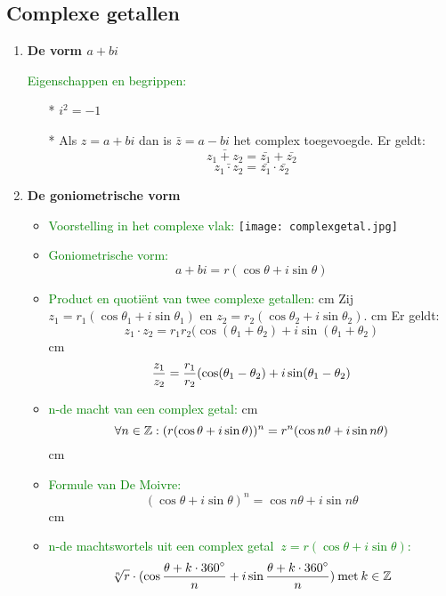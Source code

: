 \subsection{Complexe getallen} \label{complexe_getallen}
\hypertarget{complexe_getallen}{}
\begin{enumerate}%
\item \hypertarget{vorm_a_plus_bi}{{\bf De vorm $a + bi$}}\label{vorm_a_plus_bi}\vskip 0.3cm
\textcolor{green}{Eigenschappen en begrippen:}\newline
\begin{itemize} %
\item[*] $i^2=-1$
\item[*] Als $z=a+bi$ dan is $\bar{z}=a-bi$ het complex toegevoegde. \newline
		Er geldt:
		\[\bar{z_1+z_2}=\bar{z_1}+\bar{z_2}\]
		\[\bar{z_1\cdot z_2}=\bar{z_1}\cdot\bar{z_2}\]
\end{itemize}%
\item {\bf De goniometrische vorm}
\begin{itemize}
\item\textcolor{green}{Voorstelling in het complexe vlak:}\newline
\texttt{[image: complexgetal.jpg]}
\item\textcolor{green}{\hypertarget{goniometrische_vorm}{Goniometrische vorm:}}\label{goniometrische_vorm}
		\[a+bi=r(\cos\theta +i\sin\theta)\]
\item\textcolor{green}{Product en quoti\"ent van twee complexe getallen:} cm
Zij $z_1=r_1(\cos\theta_1 +i\sin\theta_1)$ en $z_2=r_2(\cos\theta_2+i\sin\theta_2)$. cm Er geldt:
\[z_1\cdot z_2=r_1r_2(\cos(\theta_1+\theta_2)+i\sin(\theta_1+\theta_2)\]  cm
\[\displaystyle\frac{\displaystyle z_1}{\displaystyle z_2}=\displaystyle\frac{\displaystyle r_1}{\displaystyle r_2}(\cos(\theta_1-\theta_2)+i\sin(\theta_1-\theta_2)\]
\item\textcolor{green}{n-de macht van een complex getal:} cm
\[\forall n\in \mathbb{Z}: (r(\cos\theta+i\sin\theta))^n=r^n(\cos n\theta + i\sin n\theta)\] cm
\item\textcolor{green}{Formule van De Moivre:}
\[(\cos \theta +i\sin\theta)^n=\cos n\theta+i\sin n \theta\] cm
\item\textcolor{green}{n-de machtswortels uit een complex getal $\:z=r(\cos\theta+i\sin\theta)$:}
\[\sqrt[n]{r}\cdot(\cos\displaystyle\frac{\displaystyle \theta+k\cdot 360^{\circ}}{\displaystyle n}+i\sin\displaystyle\frac{\displaystyle \theta+k\cdot360^{\circ}}{\displaystyle n})\: \mbox{met}\: k\in \mathbb{Z}\]

\end{itemize}
\end{enumerate}
